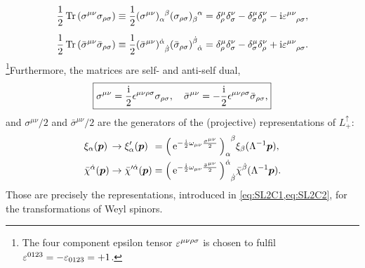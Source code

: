 \begin{gather}
	\begin{aligned}
		\frac{1}{2} \Tr{\sigma^{\mu \nu} \sigma_{\rho \sigma}} \equiv \frac{1}{2} \tensor{(\sigma^{\mu \nu})}{_{\alpha}^{\beta}} \tensor{(\sigma_{\rho \sigma})}{_{\beta}^{\alpha}}
		&= \delta^{\mu}_{\rho} \delta^{\nu}_{\sigma} - \delta^{\mu}_{\sigma} \delta^{\nu}_{\rho} - \mi \tensor{\eps}{^{\mu \nu}_{\rho \sigma}}, \\[0.5em]
		\frac{1}{2} \Tr{\bar{\sigma}^{\mu \nu} \bar{\sigma}_{\rho \sigma}} \equiv \frac{1}{2} \tensor{(\bar{\sigma}^{\mu \nu})}{^{\dot{\alpha}}_{\dot{\beta}}} \tensor{(\bar{\sigma}_{\rho \sigma})}{^{\dot{\beta}}_{\dot{\alpha}}}
		&= \delta^{\mu}_{\rho} \delta^{\nu}_{\sigma} - \delta^{\mu}_{\sigma} \delta^{\nu}_{\rho} + \mi \tensor{\eps}{^{\mu \nu}_{\rho \sigma}} \label{eq:TrSigSig}
		\text{.}
	\end{aligned}
\end{gather}
\footnote{
	The four component epsilon tensor $ \varepsilon^{\mu \nu \rho \sigma} $ is chosen to fulfil $ \varepsilon^{0123} = - \varepsilon_{0123} = + 1 $.
}Furthermore, the matrices are self- and anti-self dual,
\begin{equation}
	\begin{aligned}
		\boxed{
			\sigma^{\mu \nu} = \frac{\mi}{2} \tensor{\epsilon}{^{\mu \nu \rho \sigma}} \sigma_{\rho \sigma} , \quad
			\bar{\sigma}^{\mu \nu} = -\frac{\mi}{2} \tensor{\epsilon}{^{\mu \nu \rho \sigma}} \bar{\sigma}_{\rho \sigma}
			\text{,}
		}
	\end{aligned} \label{eq:dualtity}
\end{equation}
and $ \sigma^{\mu \nu}/ 2 $ and $ \bar{\sigma}^{\mu \nu}/ 2 $ are the generators of the (projective) representations of $ L_{+}^{\uparrow} $:
\begin{equation}
	\begin{alignedat}{3}
		&\xi_{\alpha}(\vector{p}) &&\rightarrow \xi^{\prime}_{\alpha}(\vector{p}) &&= \tensor{\Big(\operatorname{e}^{-\frac{\mi}{2} \omega_{\mu \nu} \frac{\sigma^{\mu \nu}}{2}}\Big)}{_\alpha^\beta} \xi_{\beta}(\Lambda^{-1} \vector{p}) ,\\
		&\bar{\chi}^{\dot{\alpha}}(\vector{p}) &&\rightarrow \bar{\chi}^{\prime \dot{\alpha}}(\vector{p}) &&= \tensor{\Big(\operatorname{e}^{-\frac{\mi}{2} \omega_{\mu \nu} \frac{\bar{\sigma}^{\mu \nu}}{2}}\Big)}{^{\dot{\alpha}}_{\dot{\beta}}}
		\bar{\chi}^{\dot{\beta}}(\Lambda^{-1} \vector{p}).
	\end{alignedat}
\end{equation}
Those are precisely the representations, introduced in \cref{eq:SL2C1,eq:SL2C2}, for the transformations of Weyl spinors.
\newpage
